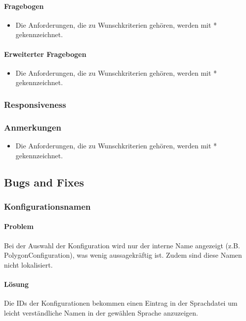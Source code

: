 \paragraph{Fragebogen}
\begin{itemize}
  \item Die Anforderungen, die zu Wunschkriterien gehören, werden mit * gekennzeichnet.
\end{itemize}
\paragraph{Erweiterter Fragebogen}
\begin{itemize}
  \item Die Anforderungen, die zu Wunschkriterien gehören, werden mit * gekennzeichnet.
\end{itemize}
\subsubsection{Responsiveness}
\subsubsection{Anmerkungen}

\begin{itemize}
  \item Die Anforderungen, die zu Wunschkriterien gehören, werden mit * gekennzeichnet.
\end{itemize}

\subsection{Bugs and Fixes}

\subsubsection{Konfigurationsnamen}
\paragraph{Problem}
Bei der Auswahl der Konfiguration wird nur der interne Name angezeigt (z.B. PolygonConfiguration),
was wenig aussagekräftig ist. Zudem sind diese Namen nicht lokalisiert.

\paragraph{Lösung}
Die IDs der Konfigurationen bekommen einen Eintrag in der Sprachdatei um leicht verständliche
Namen in der gewählen Sprache anzuzeigen.

